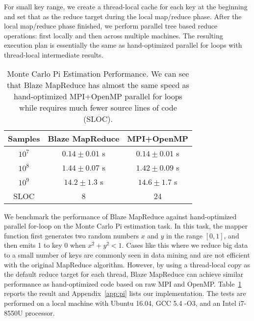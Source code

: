 For small key range, we create a thread-local cache for each key at the beginning and set that as the reduce target during the local map/reduce phase.
After the local map/reduce phase finished, we perform parallel tree based reduce operations: first locally and then across multiple machines.
The resulting execution plan is essentially the same as hand-optimized parallel for loops with thread-local intermediate results.

\begin{table}
  \caption{Monte Carlo Pi Estimation Performance.
  We can see that Blaze MapReduce has almost the same speed as hand-optimized MPI+OpenMP parallel for loops while requires much fewer source lines of code (SLOC).}
  \label{tab:pi}
  \begin{tabular}{ccc}
    \toprule
    Samples & Blaze MapReduce & MPI+OpenMP\\
    \midrule
    $10^7$ & $0.14\pm 0.01$ s& $0.14\pm 0.01$ s \\
    $10^8$ & $1.44\pm 0.07$ s& $1.42\pm 0.09$ s \\
    $10^9$ & $14.2\pm 1.3$ s& $14.6\pm 1.7$ s \\
    \midrule
    SLOC & 8 & 24 \\
  \bottomrule
\end{tabular}
\end{table}

We benchmark the performance of Blaze MapReduce against hand-optimized parallel for-loop on the Monte Carlo Pi estimation task.
In this task, the mapper function first generates two random numbers $x$ and $y$ in the range $[0, 1]$, and then emits 1 to key 0 when $x^2 + y^2 < 1$.
Cases like this where we reduce big data to a small number of keys are commonly seen in data mining and are not efficient with the original MapReduce algorithm.
However, by using a thread-local copy as the default reduce target for each thread, Blaze MapReduce can achieve similar performance as hand-optimized code based on raw MPI and OpenMP.
Table~\ref{tab:pi} reports the result and Appendix~\ref{app:pi} lists our implementation.
The tests are performed on a local machine with Ubuntu 16.04, GCC 5.4 -O3, and an Intel i7-8550U processor.

